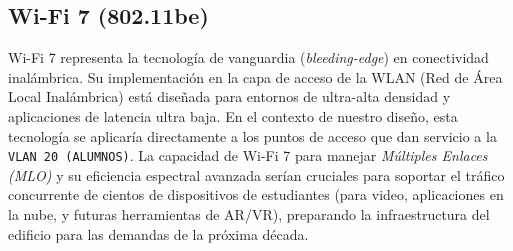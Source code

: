 \subsection{Wi-Fi 7 (802.11be)}
Wi-Fi 7 representa la tecnología de vanguardia (\textit{bleeding-edge}) en conectividad inalámbrica. Su implementación en la capa de acceso de la WLAN (Red de Área Local Inalámbrica) está diseñada para entornos de ultra-alta densidad y aplicaciones de latencia ultra baja. En el contexto de nuestro diseño, esta tecnología se aplicaría directamente a los puntos de acceso que dan servicio a la \texttt{VLAN 20 (ALUMNOS)}. La capacidad de Wi-Fi 7 para manejar \textit{Múltiples Enlaces (MLO)} y su eficiencia espectral avanzada serían cruciales para soportar el tráfico concurrente de cientos de dispositivos de estudiantes (para video, aplicaciones en la nube, y futuras herramientas de AR/VR), preparando la infraestructura del edificio para las demandas de la próxima década.